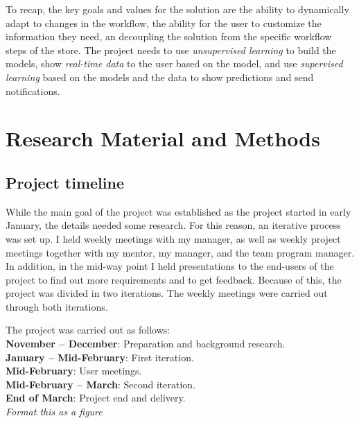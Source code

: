 \documentclass[english,12pt,a4paper,pdftex,sci,utf8]{aaltothesis}
\theoremstyle{definition}
\newcommand{\nyi}[1]{\noindent\colorbox{nyibg}{\textcolor{nyitext}{\emph{#1}}}}
\begin{document}

To recap, the key goals and values for the solution are the ability to dynamically adapt to changes in the workflow,
the ability for the user to customize the information they need, an decoupling the solution from the specific 
workflow steps of the store. The project needs to use \emph{unsupervised learning} to build the models, show \emph{real-time data} to the user based on the model, and use \emph{supervised learning} based on the models and the data to show predictions and send notifications.


\clearpage
\section{Research Material and Methods}
\label{sec:methods}


\subsection{Project timeline}
\label{sec:timeline}
While the main goal of the project was established as the project started in early January,
the details needed some research. For this reason, an iterative process was set up.
I held weekly meetings with my manager, as well as weekly project meetings together with my mentor, my manager, and the team program manager. In addition, in the mid-way point I held presentations to the end-users of the project to find out more requirements and to get feedback. Because of this, the project was divided in two iterations.
The weekly meetings were carried out through both iterations.

The project was carried out as follows:\\
\textbf{November -- December}: Preparation and background research.\\
\textbf{January -- Mid-February}: First iteration.\\
\textbf{Mid-February}: User meetings.\\
\textbf{Mid-February -- March}: Second iteration.\\
\textbf{End of March}: Project end and delivery.\\
\nyi{Format this as a figure}
\end{document}

